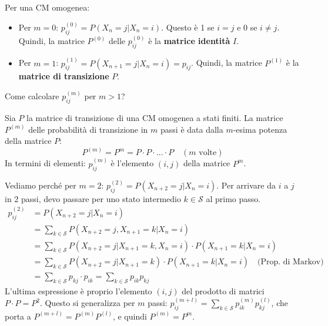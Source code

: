 \begin{proposition}
Per una CM omogenea:
\begin{itemize}
    \item Per $m=0$: $p_{ij}^{(0)} = P(X_n=j | X_n=i)$. Questo è 1 se $i=j$ e 0 se $i \neq j$.
    Quindi, la matrice $P^{(0)}$ delle $p_{ij}^{(0)}$ è la \textbf{matrice identità} $I$.
    \item Per $m=1$: $p_{ij}^{(1)} = P(X_{n+1}=j | X_n=i) = p_{ij}$.
    Quindi, la matrice $P^{(1)}$ è la \textbf{matrice di transizione} $P$.
\end{itemize}
\end{proposition}

Come calcolare $p_{ij}^{(m)}$ per $m > 1$?

\begin{theorem}
Sia $P$ la matrice di transizione di una CM omogenea a stati finiti. La matrice $P^{(m)}$ delle probabilità di transizione in $m$ passi è data dalla $m$-esima potenza della matrice $P$:
\begin{equation}
    P^{(m)} = P^m = P \cdot P \cdot \dots \cdot P \quad (m \text{ volte})
\end{equation}
In termini di elementi: $p_{ij}^{(m)}$ è l'elemento $(i,j)$ della matrice $P^m$.
\end{theorem}
Vediamo perché per $m=2$:
$p_{ij}^{(2)} = P(X_{n+2}=j | X_n=i)$.
Per arrivare da $i$ a $j$ in 2 passi, devo passare per uno stato intermedio $k \in \mathcal{S}$ al primo passo.
\begin{align*}
p_{ij}^{(2)} &= P(X_{n+2}=j | X_n=i) \\
           &= \sum_{k \in \mathcal{S}} P(X_{n+2}=j, X_{n+1}=k | X_n=i) \\
           &= \sum_{k \in \mathcal{S}} P(X_{n+2}=j | X_{n+1}=k, X_n=i) \cdot P(X_{n+1}=k | X_n=i) \\
           &= \sum_{k \in \mathcal{S}} P(X_{n+2}=j | X_{n+1}=k) \cdot P(X_{n+1}=k | X_n=i) \quad \text{(Prop. di Markov)}\\
           &= \sum_{k \in \mathcal{S}} p_{kj} \cdot p_{ik} = \sum_{k \in \mathcal{S}} p_{ik} p_{kj}
\end{align*}
L'ultima espressione è proprio l'elemento $(i,j)$ del prodotto di matrici $P \cdot P = P^2$.
Questo si generalizza per $m$ passi: $p_{ij}^{(m+l)} = \sum_{k \in \mathcal{S}} p_{ik}^{(m)} p_{kj}^{(l)}$, che porta a $P^{(m+l)} = P^{(m)} P^{(l)}$, e quindi $P^{(m)}=P^m$.

